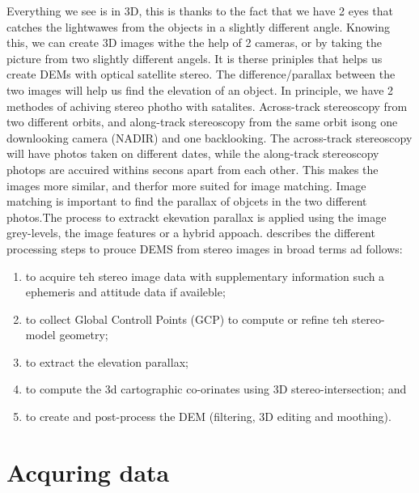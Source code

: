 \documentclass[a4paper,UKenglish]{article}
\begin{document}
Everything we see is in 3D, this is thanks to the fact that we have 2 eyes that catches the lightwawes from the objects in a slightly different angle. Knowing this, we can create 3D images withe the help of 2 cameras, or by taking the picture from two slightly different angels. It is therse priniples that helps us create DEMs with optical satellite stereo. The difference/parallax between the two images will help us find the elevation of an object. In principle, we have 2 methodes of achiving stereo photho with satalites. Across-track stereoscopy from two different orbits, and along-track stereoscopy from the same orbit isong one downlooking camera (NADIR) and one backlooking. The across-track stereoscopy will have photos taken on different dates, while the along-track stereoscopy photops are accuired withins secons apart from each other. This makes the images more similar, and therfor more suited for image matching. Image matching is important to find the parallax of objcets in the two different photos.The process to extrackt ekevation parallax is applied using the image grey-levels, the image features or a hybrid appoach. \cite{toutin01} describes the different processing steps to prouce DEMS from stereo images in broad terms ad follows: 
\begin{enumerate}
\item to acquire teh stereo image data with supplementary information such a ephemeris and attitude data if availeble;
\item to collect Global Controll Points (GCP) to compute or refine teh stereo-model geometry;
\item to extract the elevation parallax;
\item to compute the 3d cartographic co-orinates using 3D stereo-intersection; and
\item to create and post-process the DEM (filtering, 3D editing and moothing).
\end{enumerate}

\section{Acquring data}
\end{document}
